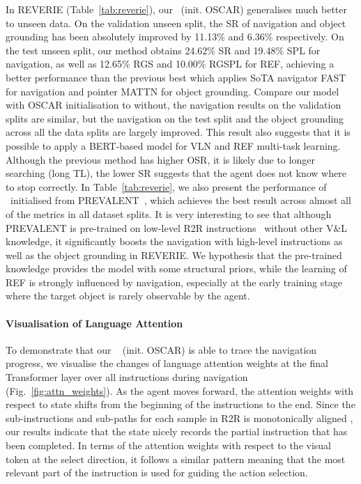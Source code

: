 \documentclass[final]{cvpr}
\begin{document}
In REVERIE \cite{qi2020reverie} (Table~\ref{tab:reverie}), our \vlnbert~(init. OSCAR) generalises much better to unseen data. On the validation unseen split, the SR of navigation and object grounding has been absolutely improved by 11.13\% and 6.36\% respectively. On the test unseen split, our method obtains 24.62\% SR and 19.48\% SPL for navigation, as well as 12.65\% RGS and 10.00\% RGSPL for REF, achieving a better performance than the previous best \cite{qi2020reverie} which applies SoTA navigator FAST \cite{ke2019tactical} for navigation and pointer MATTN \cite{yu2018mattnet} for object grounding. Compare our model with OSCAR initialisation to without, the navigation results on the validation splits are similar, but the navigation on the test split and the object grounding across all the data splits are largely improved. This result also suggests that it is possible to apply a BERT-based model for VLN and REF multi-task learning. Although the previous method has higher OSR, it is likely due to longer searching (long TL), the lower SR suggests that the agent does not know where to stop correctly. In Table~\ref{tab:reverie}, we also present the performance of \vlnbert~initialised from PREVALENT~\cite{hao2020towards}, which achieves the best result across almost all of the metrics in all dataset splits. It is very interesting to see that although PREVALENT is pre-trained on low-level R2R instructions~\cite{anderson2018vision} without other V\&L knowledge, it significantly boosts the navigation with high-level instructions as well as the object grounding in REVERIE. We hypothesis that the pre-trained knowledge provides the model with some structural priors, while the learning of REF is strongly influenced by navigation, especially at the early training stage where the target object is rarely observable by the agent.


\paragraph{Visualisation of Language Attention}
To demonstrate that our \vlnbert~ (init. OSCAR) is able to trace the navigation progress, we visualise the changes of language attention weights at the final Transformer layer over all instructions during navigation (Fig.~\ref{fig:attn_weights}). As the agent moves forward, the attention weights with respect to state shifts from the beginning of the instructions to the end. Since the sub-instructions and sub-paths for each sample in R2R is monotonically aligned \cite{hong-etal-2020-sub}, our results indicate that the state nicely records the partial instruction that has been completed. In terms of the attention weights with respect to the visual token at the select direction, it follows a similar pattern meaning that the most relevant part of the instruction is used for guiding the action selection.
\end{document}
